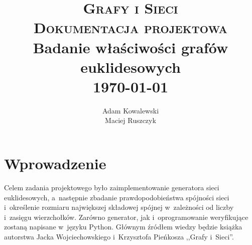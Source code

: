 \documentclass[11pt,a4paper,twoside]{report}
\begin{document}
\title{ \normalsize \textsc{Grafy i Sieci\\Dokumentacja projektowa}
		\\ [2.0cm]
		\LARGE \textbf{Badanie właściwości grafów euklidesowych}
		\\ [2.0cm]
		\normalsize \today \vspace*{3\baselineskip}}
\date{}
\author{Adam Kowalewski\\Maciej Ruszczyk}
\maketitle
\tableofcontents
\newpage

\chapter{Wprowadzenie}

Celem zadania projektowego było zaimplementowanie generatora sieci euklidesowych, a~następnie zbadanie prawdopodobieństwa spójności sieci i~określenie rozmiaru największej składowej spójnej w~zależności od liczby i~zasięgu wierzchołków. Zarówno generator, jak i~oprogramowanie weryfikujące zostaną napisane w~języku Python. Głównym źródłem wiedzy będzie książka autorstwa Jacka Wojciechowskiego i~Krzysztofa Pieńkosza ,,Grafy i~Sieci''.\cite{WojciechowskiJacek2013Gis}

\printbibliography[heading=bibintoc]
\end{document}
